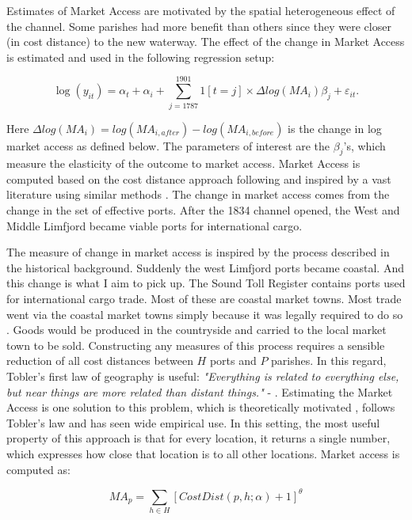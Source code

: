 \documentclass[11pt]{article}
\begin{document}
Estimates of Market Access are motivated by the spatial heterogeneous effect of the channel. Some parishes had more benefit than others since they were closer (in cost distance) to the new waterway. The effect of the change in Market Access is estimated and used in the following regression setup: 

\begin{equation}
\label{eq:eq503}
\log(y_{it})= \alpha_t + \alpha_i + \sum_{j=1787}^{1901} 1[t=j] \times \Delta log(MA_i)\beta_{j} + \varepsilon_{it}.
\end{equation}

Here $\Delta log(MA_i) = log(MA_{i,after}) - log(MA_{i,before})$ is the change in log market access as defined below. The parameters of interest are the $\beta_{j}$'s, which measure the elasticity of the outcome to market access.  Market Access is computed based on the cost distance approach following \cite{rauch2022a} and inspired by a vast literature using similar methods \citep{Harris1954, Redding2008, Ahlfeldt2015, Donaldson2016}. The change in market access comes from the change in the set of effective ports. After the 1834 channel opened, the West and Middle Limfjord became viable ports for international cargo. 

The measure of change in market access is inspired by the process described in the historical background. Suddenly the west Limfjord ports became coastal. And this change is what I aim to pick up. The Sound Toll Register contains ports used for international cargo trade. Most of these are coastal market towns. Most trade went via the coastal market towns simply because it was legally required to do so \cite{Degn1989}. Goods would be produced in the countryside and carried to the local market town to be sold. Constructing any measures of this process requires a sensible reduction of all cost distances between $H$ ports and $P$ parishes. In this regard, Tobler's first law of geography is useful: \textit{"Everything is related to everything else, but near things are more related than distant things."} - \cite{Tobler1970}. Estimating the Market Access is one solution to this problem, which is theoretically motivated \citep{eaton2002}, follows Tobler's law and has seen wide empirical use. In this setting, the most useful property of this approach is that for every location, it returns a single number, which expresses how close that location is to all other locations. Market access is computed as:

\begin{equation}
\label{eq:MA2}
{MA}_p = \sum_{h \in H} [CostDist(p, h; \alpha) + 1]^\theta
\end{equation}
\end{document}
